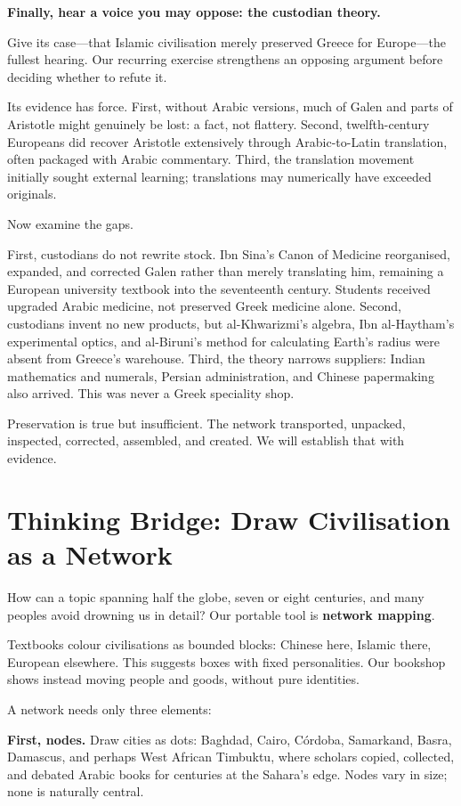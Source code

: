 \textbf{Finally, hear a voice you may oppose: the custodian theory.}

Give its case---that Islamic civilisation merely preserved Greece for Europe---the fullest hearing. Our recurring exercise strengthens an opposing argument before deciding whether to refute it.

Its evidence has force. First, without Arabic versions, much of Galen and parts of Aristotle might genuinely be lost: a fact, not flattery. Second, twelfth-century Europeans did recover Aristotle extensively through Arabic-to-Latin translation, often packaged with Arabic commentary. Third, the translation movement initially sought external learning; translations may numerically have exceeded originals.

Now examine the gaps.

First, custodians do not rewrite stock. Ibn Sina's Canon of Medicine reorganised, expanded, and corrected Galen rather than merely translating him, remaining a European university textbook into the seventeenth century. Students received upgraded Arabic medicine, not preserved Greek medicine alone. Second, custodians invent no new products, but al-Khwarizmi's algebra, Ibn al-Haytham's experimental optics, and al-Biruni's method for calculating Earth's radius were absent from Greece's warehouse. Third, the theory narrows suppliers: Indian mathematics and numerals, Persian administration, and Chinese papermaking also arrived. This was never a Greek speciality shop.

Preservation is true but insufficient. The network transported, unpacked, inspected, corrected, assembled, and created. We will establish that with evidence.

\section[Thinking Bridge: Map the Network]{Thinking Bridge: Draw Civilisation as a Network}
How can a topic spanning half the globe, seven or eight centuries, and many peoples avoid drowning us in detail? Our portable tool is \textbf{network mapping}.

Textbooks colour civilisations as bounded blocks: Chinese here, Islamic there, European elsewhere. This suggests boxes with fixed personalities. Our bookshop shows instead moving people and goods, without pure identities.

A network needs only three elements:

\textbf{First, nodes.} Draw cities as dots: Baghdad, Cairo, Córdoba, Samarkand, Basra, Damascus, and perhaps West African Timbuktu, where scholars copied, collected, and debated Arabic books for centuries at the Sahara's edge. Nodes vary in size; none is naturally central.

